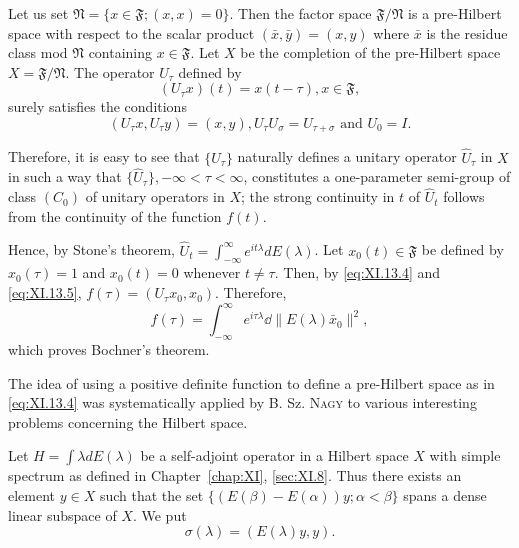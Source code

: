 Let us set $\mathfrak{N} = \{x \in \mathfrak{F}; (x, x) = 0\}$. Then the factor space $\mathfrak{F}/\mathfrak{N}$ is a pre-Hilbert space with respect to the scalar product $(\bar{x}, \bar{y}) = (x, y)$ where $\bar{x}$ is the residue class mod $\mathfrak{N}$ containing $x \in \mathfrak{F}$. Let $X$ be the completion of the pre-Hilbert space $X = \mathfrak{F}/\mathfrak{N}$. The operator $U_{\tau}$ defined by 
\begin{equation}\label{eq:XI.13.5}
(U _{\tau} x) (t) = x (t - \tau), x \in \mathfrak {F},
\end{equation}
surely satisfies the conditions 
\begin{equation}\label{eq:XI.13.6}
(U _{\tau} x, U _{\tau} y) = (x, y), U _{\tau} U _{\sigma} = U _{\tau + \sigma} \text{ and } U _{0} = I.
\end{equation}

Therefore, it is easy to see that $\{U_{\tau}\}$ naturally defines a unitary operator $\hat{U}_{\tau}$ in $X$ in such a way that $\{\hat{U}_{\tau}\}, -\infty < \tau < \infty$, constitutes a one-parameter semi-group of class $(C_{0})$ of unitary operators in $X$; the strong continuity in $t$ of $\hat{U}_{t}$ follows from the continuity of the function $f(t)$. 

Hence, by Stone's theorem, $\hat{U}_t = \int_{-\infty}^{\infty} e^{it\lambda} dE(\lambda)$. Let $x_0(t) \in \mathfrak{F}$ be defined by $x_0(\tau) = 1$ and $x_0(t) = 0$ whenever $t \neq \tau$. Then, by \eqref{eq:XI.13.4} and \eqref{eq:XI.13.5}, $f(\tau) = (U_\tau x_0, x_0)$. Therefore, 
\[
f (\tau) = \int_{- \infty} ^{\infty} e ^{i \tau \lambda} \dd \| E (\lambda) \bar {x} _{0} \| ^{2},
\]
which proves Bochner's theorem. 

\begin{remarku} The idea of using a positive definite function to define a pre-Hilbert space as in \eqref{eq:XI.13.4} was systematically applied by B. Sz. \textsc{Nagy} \cite{nagy219} to various interesting problems concerning the Hilbert space. 
\end{remarku}


\label{sec:XI.14}

Let $H = \int \lambda dE(\lambda)$ be a self-adjoint operator in a Hilbert space $X$ with simple spectrum as defined in Chapter~\ref{chap:XI}, \ref{sec:XI.8}. Thus there exists an element $y \in X$ such that the set $\{(E(\beta) - E(\alpha))y; \alpha < \beta\}$ spans a dense linear subspace of $X$. We put 
\begin{equation}\label{eq:XI.14.1}
\sigma (\lambda) = (E (\lambda) y, y).
\end{equation}

